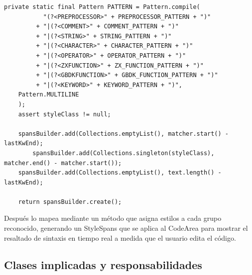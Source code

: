 \documentclass[../../main.tex]{subfiles}
\begin{document}
\begin{lstlisting}[style=mystyle, caption={Codigo de la clase SyntaxHighlighter.java}, label={lst:codigo_SyntaxHighlighter}]
    private static final Pattern PATTERN = Pattern.compile(
           "(?<PREPROCESSOR>" + PREPROCESSOR_PATTERN + ")"
         + "|(?<COMMENT>" + COMMENT_PATTERN + ")"
         + "|(?<STRING>" + STRING_PATTERN + ")"
         + "|(?<CHARACTER>" + CHARACTER_PATTERN + ")"
         + "|(?<OPERATOR>" + OPERATOR_PATTERN + ")"
         + "|(?<ZXFUNCTION>" + ZX_FUNCTION_PATTERN + ")"
         + "|(?<GBDKFUNCTION>" + GBDK_FUNCTION_PATTERN + ")"
         + "|(?<KEYWORD>" + KEYWORD_PATTERN + ")",
    Pattern.MULTILINE
    );
    assert styleClass != null;

    spansBuilder.add(Collections.emptyList(), matcher.start() - lastKwEnd);
        spansBuilder.add(Collections.singleton(styleClass), matcher.end() - matcher.start());
    spansBuilder.add(Collections.emptyList(), text.length() - lastKwEnd);

    return spansBuilder.create();
\end{lstlisting}

Después lo mapea mediante un método que asigna estilos a cada grupo reconocido, generando un StyleSpans que se aplica al CodeArea para mostrar el resaltado de sintaxis en tiempo real a medida que el usuario edita el código.

\clearpage

\subsection{Clases implicadas y responsabilidades}
\end{document}
